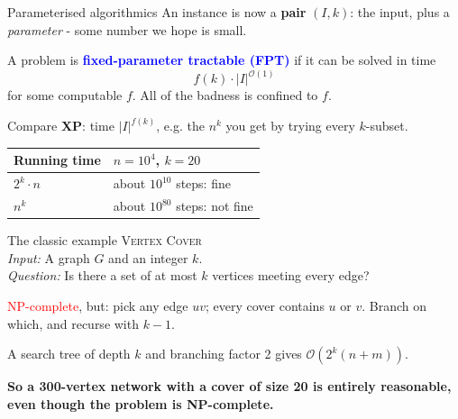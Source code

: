 \documentclass[10pt, compress]{beamer}
\begin{document}
\begin{frame}{Parameterised algorithmics}
An instance is now a \textbf{pair} $(I, k)$: the input, plus a \emph{parameter} - some number we hope is small.

\bigskip

A problem is \textbf{\textcolor{blue}{fixed-parameter tractable (FPT)}} if it can be solved in time
\[
f(k) \cdot |I|^{\mathcal{O}(1)}
\]
for some computable $f$.  All of the badness is confined to $f$.

\bigskip

Compare \textbf{XP}: time $|I|^{f(k)}$, e.g. the $n^{k}$ you get by trying every $k$-subset.

\begin{center}
\begin{tabular}{l l}
\toprule
\textbf{Running time} & \textbf{$n = 10^4$, $k = 20$} \\
\midrule
$2^{k} \cdot n$ & about $10^{10}$ steps: fine \\
$n^{k}$ & about $10^{80}$ steps: not fine \\
\bottomrule
\end{tabular}
\end{center}
\end{frame}


\begin{frame}{The classic example}
\textsc{Vertex Cover}\\
\textit{Input:} A graph $G$ and an integer $k$.\\
\textit{Question:} Is there a set of at most $k$ vertices meeting every edge?

\bigskip

\textcolor{red}{NP-complete}, but: pick any edge $uv$; every cover contains $u$ or $v$.  Branch on which, and recurse with $k - 1$.

\bigskip

A search tree of depth $k$ and branching factor 2 gives $\mathcal{O}(2^{k}(n + m))$.

\bigskip

\textbf{So a 300-vertex network with a cover of size 20 is entirely reasonable, even though the problem is NP-complete.}
\end{frame}
\end{document}
